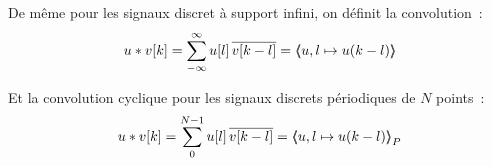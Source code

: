 De même pour les signaux discret à support infini, on définit la convolution~:
\begin{equation}
  \label{eq:convolution_discrete}
  u\ast v[k] = \sum\limits_{-\infty}^{\infty}{u[l]\,\overline{v[k-l]}} = \langle\!\!\langle u,l\mapsto u(k-l)\rangle\!\!\rangle
\end{equation}

Et la convolution cyclique pour les signaux discrets périodiques de $N$ points~:
\begin{equation}
  \label{eq:convolution_discrete}
  u\ast v[k] = \sum\limits_{0}^{N-1}{u[l]\,\overline{v[k-l]}} = \langle\!\!\langle u,l\mapsto u(k-l){\rangle\!\!\rangle}_P
\end{equation}



